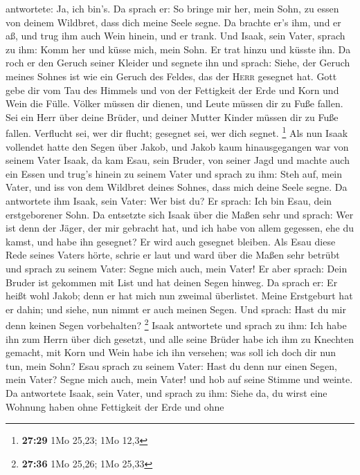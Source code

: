 antwortete: Ja, ich bin's.  Da sprach er: So bringe mir
her, mein Sohn, zu essen von deinem Wildbret, dass dich meine Seele
segne. Da brachte er's ihm, und er aß, und trug ihm auch Wein hinein,
und er trank.  Und Isaak, sein Vater, sprach zu ihm: Komm
her und küsse mich, mein Sohn.  Er trat hinzu und küsste
ihn. Da roch er den Geruch seiner Kleider und segnete ihn und sprach:
Siehe, der Geruch meines Sohnes ist wie ein Geruch des Feldes, das der
\textsc{Herr} gesegnet hat.  Gott gebe dir vom Tau des
Himmels und von der Fettigkeit der Erde und Korn und Wein die Fülle.
 Völker müssen dir dienen, und Leute müssen dir zu Fuße
fallen. Sei ein Herr über deine Brüder, und deiner Mutter Kinder müssen
dir zu Fuße fallen. Verflucht sei, wer dir flucht; gesegnet sei, wer
dich segnet. \footnote{\textbf{27:29} 1Mo 25,23; 1Mo 12,3}
 Als nun Isaak vollendet hatte den Segen über Jakob, und
Jakob kaum hinausgegangen war von seinem Vater Isaak, da kam Esau, sein
Bruder, von seiner Jagd  und machte auch ein Essen und
trug's hinein zu seinem Vater und sprach zu ihm: Steh auf, mein Vater,
und iss von dem Wildbret deines Sohnes, dass mich deine Seele segne.
 Da antwortete ihm Isaak, sein Vater: Wer bist du? Er
sprach: Ich bin Esau, dein erstgeborener Sohn.  Da
entsetzte sich Isaak über die Maßen sehr und sprach: Wer ist denn der
Jäger, der mir gebracht hat, und ich habe von allem gegessen, ehe du
kamst, und habe ihn gesegnet? Er wird auch gesegnet bleiben.
 Als Esau diese Rede seines Vaters hörte, schrie er laut
und ward über die Maßen sehr betrübt und sprach zu seinem Vater: Segne
mich auch, mein Vater!  Er aber sprach: Dein Bruder ist
gekommen mit List und hat deinen Segen hinweg.  Da sprach
er: Er heißt wohl Jakob; denn er hat mich nun zweimal überlistet. Meine
Erstgeburt hat er dahin; und siehe, nun nimmt er auch meinen Segen. Und
sprach: Hast du mir denn keinen Segen vorbehalten? \footnote{\textbf{27:36}
  1Mo 25,26; 1Mo 25,33}  Isaak antwortete und sprach zu
ihm: Ich habe ihn zum Herrn über dich gesetzt, und alle seine Brüder
habe ich ihm zu Knechten gemacht, mit Korn und Wein habe ich ihn
versehen; was soll ich doch dir nun tun, mein Sohn?  Esau
sprach zu seinem Vater: Hast du denn nur einen Segen, mein Vater? Segne
mich auch, mein Vater! und hob auf seine Stimme und weinte.
 Da antwortete Isaak, sein Vater, und sprach zu ihm:
Siehe da, du wirst eine Wohnung haben ohne Fettigkeit der Erde und ohne
